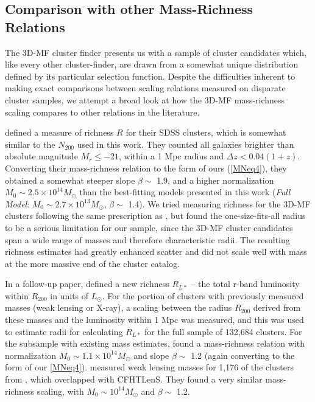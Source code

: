 
\subsection{Comparison with other Mass-Richness Relations}

The \ac{3D-MF} cluster finder presents us with a sample of cluster candidates which, like every other cluster-finder, are drawn from a somewhat unique distribution defined by its particular selection function. Despite the difficulties inherent to making exact comparisons between scaling relations measured on disparate cluster samples, we attempt a broad look at how the \ac{3D-MF} mass-richness scaling compares to other relations in the literature.

\citet{Wen09} defined a measure of richness $R$ for their \ac{SDSS} clusters, which is somewhat similar to the $N_{200}$ used in this work. They counted all galaxies brighter than absolute magnitude $M_r \leq -21$, within a 1 Mpc radius and $\Delta z < 0.04(1+z)$. Converting their mass-richness relation to the form of ours (\autoref{MNeq4}), they obtained a somewhat steeper slope $\beta \sim$ 1.9, and a higher normalization $M_0 \sim 2.5\times10^{14} M_{\odot}$ than the best-fitting models presented in this work ({\it Full Model}: $M_0 \sim 2.7\times10^{13} M_{\odot}$, $\beta \sim$ 1.4). We tried measuring richness for the \ac{3D-MF} clusters following the same prescription as \citet{Wen09}, but found the one-size-fits-all radius to be a serious limitation for our sample, since the \ac{3D-MF} cluster candidates span a wide range of masses and therefore characteristic radii. The resulting richness estimates had greatly enhanced scatter and did not scale well with mass at the more massive end of the cluster catalog.

In a follow-up paper, \citet{Wen12} defined a new richness $R_{L*}$ -- the total r-band luminosity within $R_{200}$ in units of $L_{\odot}$. For the portion of clusters with previously measured masses (weak lensing or X-ray), a scaling between the radius $R_{200}$ derived from these masses and the luminosity within 1 Mpc was measured, and this was used to estimate radii for calculating $R_{L*}$ for the full sample of 132,684 clusters. For the subsample with existing mass estimates, \citet{Wen12} found a mass-richness relation with normalization $M_0 \sim 1.1 \times 10^{14} M_{\odot}$ and slope $\beta \sim$ 1.2 (again converting to the form of our \autoref{MNeq4}). \citet{Covone14} measured weak lensing masses for 1,176 of the clusters from \citet{Wen12}, which overlapped with \ac{CFHTLenS}. They found a very similar mass-richness scaling, with $M_0 \sim 10^{14} M_{\odot}$ and $\beta \sim$ 1.2. 


